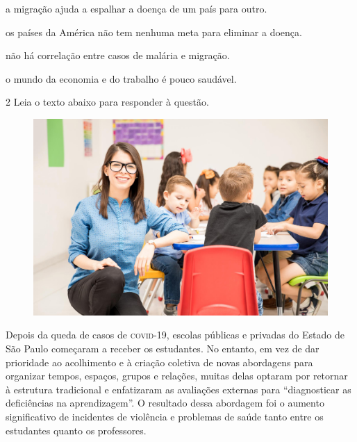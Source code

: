 \begin{escolha}

  \item a migração ajuda a espalhar a doença de um país para outro.

  \item os países da América não tem nenhuma meta para eliminar a doença.

  \item não há correlação entre casos de malária e migração. 

  \item o mundo da economia e do trabalho é pouco saudável.

\end{escolha}

\num{2} Leia o texto abaixo para responder à questão.

\begin{myquote}

\begin{figure}[H]
\centering
\includegraphics[scale=0.35]{./imgSAEB_7_POR/media/image27.png}
\end{figure}

Depois da queda de casos de \textsc{covid}-19, escolas públicas e privadas 
do Estado de São Paulo começaram a receber os estudantes. No entanto, em vez 
de dar prioridade ao acolhimento e à criação coletiva de novas abordagens para
organizar tempos, espaços, grupos e relações, muitas delas optaram por retornar 
à estrutura tradicional e enfatizaram as avaliações externas para ``diagnosticar 
as deficiências na aprendizagem''. O resultado dessa abordagem foi o aumento 
significativo de incidentes de violência e problemas de saúde tanto entre os
estudantes quanto os professores.

\end{myquote}

